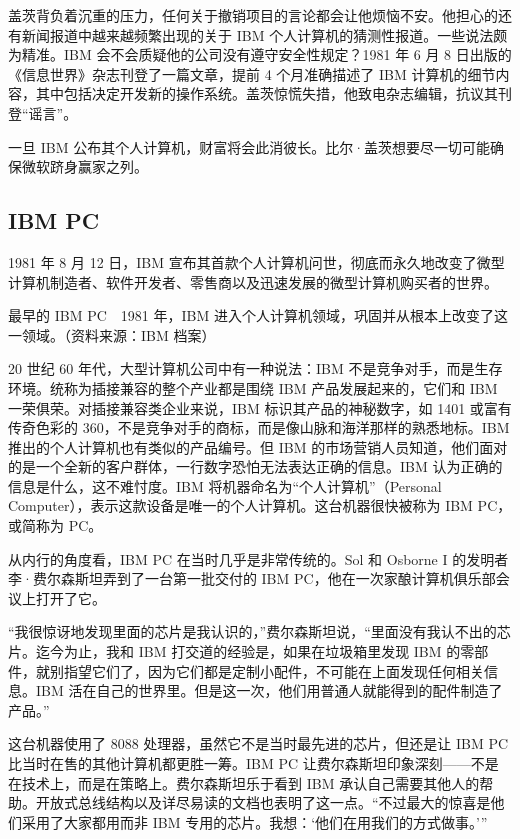 \documentclass[12pt,UTF8]{ctexbook}
\begin{document}
盖茨背负着沉重的压力，任何关于撤销项目的言论都会让他烦恼不安。他担心的还有新闻报道中越来越频繁出现的关于 IBM 个人计算机的猜测性报道。一些说法颇为精准。IBM 会不会质疑他的公司没有遵守安全性规定？1981 年 6 月 8 日出版的《信息世界》杂志刊登了一篇文章，提前 4 个月准确描述了 IBM 计算机的细节内容，其中包括决定开发新的操作系统。盖茨惊慌失措，他致电杂志编辑，抗议其刊登“谣言”。

一旦 IBM 公布其个人计算机，财富将会此消彼长。比尔·盖茨想要尽一切可能确保微软跻身赢家之列。





\subsection{IBM PC}


1981 年 8 月 12 日，IBM 宣布其首款个人计算机问世，彻底而永久地改变了微型计算机制造者、软件开发者、零售商以及迅速发展的微型计算机购买者的世界。



最早的 IBM PC　1981 年，IBM 进入个人计算机领域，巩固并从根本上改变了这一领域。（资料来源：IBM 档案）

20 世纪 60 年代，大型计算机公司中有一种说法：IBM 不是竞争对手，而是生存环境。统称为插接兼容的整个产业都是围绕 IBM 产品发展起来的，它们和 IBM 一荣俱荣。对插接兼容类企业来说，IBM 标识其产品的神秘数字，如 1401 或富有传奇色彩的 360，不是竞争对手的商标，而是像山脉和海洋那样的熟悉地标。IBM 推出的个人计算机也有类似的产品编号。但 IBM 的市场营销人员知道，他们面对的是一个全新的客户群体，一行数字恐怕无法表达正确的信息。IBM 认为正确的信息是什么，这不难忖度。IBM 将机器命名为“个人计算机”（Personal Computer），表示这款设备是唯一的个人计算机。这台机器很快被称为 IBM PC，或简称为 PC。

从内行的角度看，IBM PC 在当时几乎是非常传统的。Sol 和 Osborne I 的发明者李·费尔森斯坦弄到了一台第一批交付的 IBM PC，他在一次家酿计算机俱乐部会议上打开了它。

“我很惊讶地发现里面的芯片是我认识的，”费尔森斯坦说，“里面没有我认不出的芯片。迄今为止，我和 IBM 打交道的经验是，如果在垃圾箱里发现 IBM 的零部件，就别指望它们了，因为它们都是定制小配件，不可能在上面发现任何相关信息。IBM 活在自己的世界里。但是这一次，他们用普通人就能得到的配件制造了产品。”

这台机器使用了 8088 处理器，虽然它不是当时最先进的芯片，但还是让 IBM PC 比当时在售的其他计算机都更胜一筹。IBM PC 让费尔森斯坦印象深刻——不是在技术上，而是在策略上。费尔森斯坦乐于看到 IBM 承认自己需要其他人的帮助。开放式总线结构以及详尽易读的文档也表明了这一点。“不过最大的惊喜是他们采用了大家都用而非 IBM 专用的芯片。我想：‘他们在用我们的方式做事。’”
\end{document}

